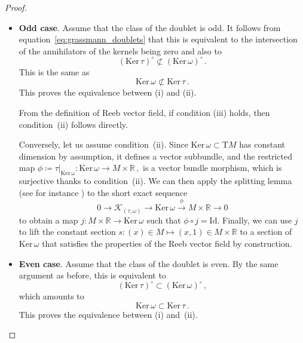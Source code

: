 \documentclass[11pt,twoside]{article}
\theoremstyle{plain}
\theoremstyle{definition}
\newcommand{\R}{\mathbb{R}}
\newcommand{\T}{{\mathrm T}}
\newcommand{\Id}{\mathrm{Id}}
\def\Ker{\mathrm{Ker \,}}
\def\K{\mathcal{K}}
\def\longto{\longrightarrow}
\begin{document}
\begin{proof}\,
\begin{itemize}
\item \textbf{Odd case}.
Assume that the class of the doublet is odd. 
It follows from equation~\eqref{eq:grassmann_doublets} that this is equivalent to the intersection of the annihilators of the kernels being zero and also to
$$
(\Ker \tau)^{\circ} \not\subset (\Ker \omega)^{\circ}\,.
$$
This is the same as
\begin{equation} \label{eq:annihilator_inclusion_odd}
\Ker \omega \not\subset \Ker\tau\,.
\end{equation}
This proves the equivalence between (i) and (ii).

From the definition of Reeb vector field, 
if condition (iii) holds, 
then condition~(ii) follows directly.

Conversely, let us assume condition~(ii). 
Since $\Ker \omega\subset \T M$ has constant dimension by assumption, it defines a vector subbundle, and the restricted map
$\phi\coloneqq \tau|_{\Ker \omega} \colon \Ker \omega \longto M \times \R\,,$
is a vector bundle morphism, which is surjective thanks to condition~(ii). 
We can then apply the splitting lemma (see for instance 
\cite[p.\,118]{Die_EA3})
to the short exact sequence
$$
0 \longrightarrow \K_{(\tau,\omega)} \longrightarrow \Ker \omega \xrightarrow{\ \phi\ } M \times \R \longrightarrow 0
$$
to obtain a map $j\colon M\times \R \to \Ker \omega$ such that $\phi \circ j = \Id$. Finally, we can use $j$ to lift the constant section $s\colon (x)\in M \mapsto (x,1)\in  M\times \R$ to a section of $\Ker \omega$ that satisfies the properties of the Reeb vector field by construction.



\item \textbf{Even case}.
Assume that the class of the doublet is even. 
By the same argument as before, this is equivalent to
\begin{equation}
\label{annihilator_inclusion_even}
(\Ker \tau)^{\circ} \subset (\Ker \omega)^{\circ}
\,,
\end{equation}
which amounts to
$$
\Ker \omega \subset \Ker \tau
\,.
$$
This proves the equivalence between (i) and~(ii).


\end{itemize}
\end{proof}
\end{document}
